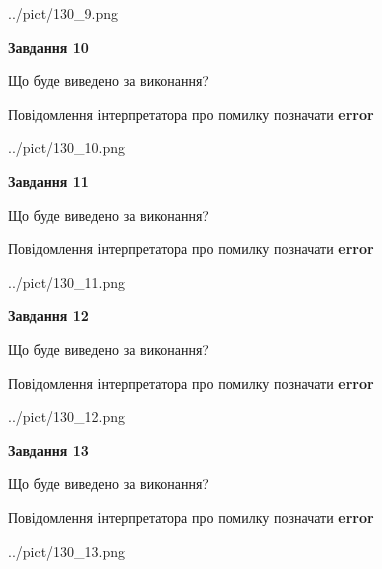 \documentclass[11pt, ukrainian]{article}
\begin{document}
{\begin {large}
\begin{center}
	{../pict/130_9.png}
\end{center}
\newpage

{\begin {center}\textbf{Завдання 10}\end {center}}\par
Що буде виведено за виконання? \par
Повідомлення інтерпретатора про помилку позначати \textbf{error}

\begin{center}
	{../pict/130_10.png}
\end{center}
\newpage

{\begin {center}\textbf{Завдання 11}\end {center}}\par
Що буде виведено за виконання? \par
Повідомлення інтерпретатора про помилку позначати \textbf{error}

\begin{center}
	{../pict/130_11.png}
\end{center}
\newpage

{\begin {center}\textbf{Завдання 12}\end {center}}\par
Що буде виведено за виконання? \par
Повідомлення інтерпретатора про помилку позначати \textbf{error}

\begin{center}
	{../pict/130_12.png}
\end{center}
\newpage

{\begin {center}\textbf{Завдання 13}\end {center}}\par
Що буде виведено за виконання? \par
Повідомлення інтерпретатора про помилку позначати \textbf{error}

\begin{center}
	{../pict/130_13.png}
\end{center}
\newpage


\end{large}}
\end{document}
